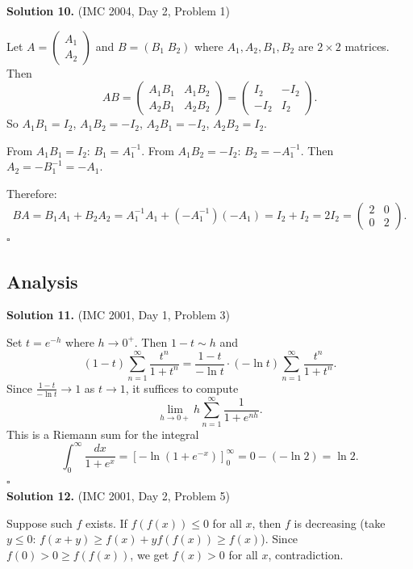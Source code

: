 \documentclass{article}
\begin{document}
\textbf{Solution 10.} (IMC 2004, Day 2, Problem 1)

Let \( A = \begin{pmatrix} A_1 \\ A_2 \end{pmatrix} \) and \( B = (B_1 \; B_2) \) where \( A_1, A_2, B_1, B_2 \) are \( 2 \times 2 \) matrices. Then
\[
AB = \begin{pmatrix} A_1B_1 & A_1B_2 \\ A_2B_1 & A_2B_2 \end{pmatrix}
= \begin{pmatrix} I_2 & -I_2 \\ -I_2 & I_2 \end{pmatrix}.
\]
So \( A_1B_1 = I_2 \), \( A_1B_2 = -I_2 \), \( A_2B_1 = -I_2 \), \( A_2B_2 = I_2 \).

From \( A_1B_1 = I_2 \): \( B_1 = A_1^{-1} \). From \( A_1B_2 = -I_2 \): \( B_2 = -A_1^{-1} \).
Then \( A_2 = -B_1^{-1} = -A_1 \).

Therefore:
\[
BA = B_1A_1 + B_2A_2 = A_1^{-1}A_1 + (-A_1^{-1})(-A_1) = I_2 + I_2 = \boxed{2I_2 = \begin{pmatrix} 2 & 0 \\ 0 & 2 \end{pmatrix}}.
\]
\hfill\(\square\)

\newpage

\subsection*{Analysis}

\textbf{Solution 11.} (IMC 2001, Day 1, Problem 3)

Set \( t = e^{-h} \) where \( h \to 0^+ \). Then \( 1 - t \sim h \) and
\[
(1-t)\sum_{n=1}^{\infty}\frac{t^n}{1+t^n}
= \frac{1-t}{-\ln t}\cdot(-\ln t)\sum_{n=1}^{\infty}\frac{t^n}{1+t^n}.
\]
Since \( \frac{1-t}{-\ln t} \to 1 \) as \( t \to 1 \), it suffices to compute
\[
\lim_{h\to 0+} h \sum_{n=1}^{\infty} \frac{1}{1 + e^{nh}}.
\]
This is a Riemann sum for the integral
\[
\int_0^{\infty} \frac{dx}{1 + e^x} = \left[-\ln(1+e^{-x})\right]_0^{\infty} = 0 - (-\ln 2) = \ln 2.
\]
\hfill\(\square\)
\\

\textbf{Solution 12.} (IMC 2001, Day 2, Problem 5)

Suppose such \( f \) exists. If \( f(f(x)) \leq 0 \) for all \( x \), then \( f \) is decreasing (take \( y \leq 0 \): \( f(x+y) \geq f(x) + yf(f(x)) \geq f(x) \)). Since \( f(0) > 0 \geq f(f(x)) \), we get \( f(x) > 0 \) for all \( x \), contradiction.
\end{document}
